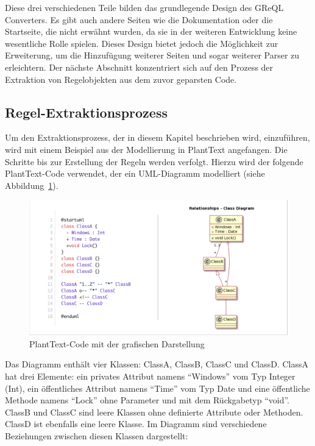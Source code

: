 Diese drei verschiedenen Teile bilden das grundlegende Design des \gls{GReQL Converter}s. Es gibt auch andere Seiten wie die
Dokumentation oder die Startseite, die nicht erwähnt wurden, da sie in der weiteren Entwicklung keine wesentliche Rolle
spielen. Dieses Design bietet jedoch die Möglichkeit zur Erweiterung, um die Hinzufügung weiterer Seiten und sogar
weiterer Parser zu erleichtern. Der nächste Abschnitt konzentriert sich auf den Prozess der Extraktion von Regelobjekten
aus dem zuvor geparsten Code.

\subsection{Regel-Extraktionsprozess}\label{subsec:regel-extraktionsprozess}


Um den Extraktionsprozess, der in diesem Kapitel beschrieben wird, einzuführen, wird mit einem Beispiel aus der
Modellierung in PlantText angefangen. Die Schritte bis zur Erstellung der Regeln werden verfolgt. Hierzu wird der
folgende PlantText-Code verwendet, der ein UML-Diagramm modelliert (siehe Abbildung~\ref{fig:code-uml}).

\begin{figure}[h!]
    \centering
    \includegraphics[width=16cm]{images/code-uml}
    \caption{PlantText-Code mit der grafischen Darstellung}
    \label{fig:code-uml}
\end{figure}

Das Diagramm enthält vier Klassen: ClassA, ClassB, ClassC und ClassD\@. ClassA hat drei Elemente: ein privates Attribut
namens ``Windows'' vom Typ Integer (Int), ein öffentliches Attribut namens ``Time'' vom Typ Date und eine öffentliche
Methode namens ``Lock'' ohne Parameter und mit dem Rückgabetyp ``void''. ClassB und ClassC sind leere Klassen ohne
definierte Attribute oder Methoden. ClassD ist ebenfalls eine leere Klasse. Im Diagramm sind verschiedene Beziehungen
zwischen diesen Klassen dargestellt:

